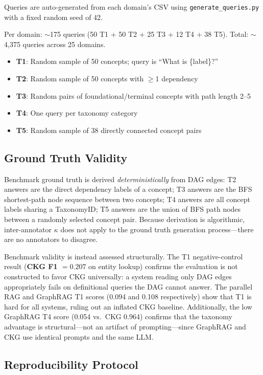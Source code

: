 Queries are auto-generated from each domain's CSV using
\texttt{generate\_queries.py} with a fixed random seed of 42.

Per domain: $\sim$175 queries (50 T1 + 50 T2 + 25 T3 + 12 T4 + 38 T5).
Total: $\sim$4,375 queries across 25 domains.

\begin{itemize}
  \item \textbf{T1}: Random sample of 50 concepts; query is ``What is \{label\}?''
  \item \textbf{T2}: Random sample of 50 concepts with $\geq$1 dependency
  \item \textbf{T3}: Random pairs of foundational/terminal concepts with path length 2--5
  \item \textbf{T4}: One query per taxonomy category
  \item \textbf{T5}: Random sample of 38 directly connected concept pairs
\end{itemize}

\subsection{Ground Truth Validity}\label{sec:validation}

Benchmark ground truth is derived \emph{deterministically} from DAG edges:
T2 answers are the direct dependency labels of a concept; T3 answers are the
BFS shortest-path node sequence between two concepts; T4 answers are all
concept labels sharing a TaxonomyID; T5 answers are the union of BFS path
nodes between a randomly selected concept pair. Because derivation is
algorithmic, inter-annotator $\kappa$ does not apply to the ground truth
generation process---there are no annotators to disagree.

Benchmark validity is instead assessed structurally. The T1 negative-control
result (\textbf{CKG F1 $= 0.207$} on entity lookup) confirms the evaluation
is not constructed to favor CKG universally: a system reading only DAG edges
appropriately fails on definitional queries the DAG cannot answer. The
parallel RAG and GraphRAG T1 scores (0.094 and 0.108 respectively) show that
T1 is hard for all systems, ruling out an inflated CKG baseline. Additionally,
the low GraphRAG T4 score (0.054 vs.\ CKG 0.964) confirms that the taxonomy
advantage is structural---not an artifact of prompting---since GraphRAG and
CKG use identical prompts and the same LLM.

\subsection{Reproducibility Protocol}\label{sec:reproducibility}

